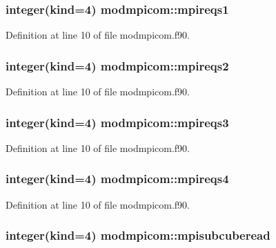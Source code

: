 \hypertarget{classmodmpicom_a34052e13410e6236c45dcfc1b5563200}{
\subsubsection[{mpireqs1}]{\setlength{\rightskip}{0pt plus 5cm}integer(kind=4) modmpicom\-::mpireqs1}}\label{classmodmpicom_a34052e13410e6236c45dcfc1b5563200}


Definition at line 10 of file modmpicom.\-f90.

\hypertarget{classmodmpicom_a24670bd8507b230a6be2c2f3afabf5c1}{
\subsubsection[{mpireqs2}]{\setlength{\rightskip}{0pt plus 5cm}integer(kind=4) modmpicom\-::mpireqs2}}\label{classmodmpicom_a24670bd8507b230a6be2c2f3afabf5c1}


Definition at line 10 of file modmpicom.\-f90.

\hypertarget{classmodmpicom_a7105e5547fa246381624c998c59249b9}{
\subsubsection[{mpireqs3}]{\setlength{\rightskip}{0pt plus 5cm}integer(kind=4) modmpicom\-::mpireqs3}}\label{classmodmpicom_a7105e5547fa246381624c998c59249b9}


Definition at line 10 of file modmpicom.\-f90.

\hypertarget{classmodmpicom_a848fe3dd718230ed7fb98e58796619ea}{
\subsubsection[{mpireqs4}]{\setlength{\rightskip}{0pt plus 5cm}integer(kind=4) modmpicom\-::mpireqs4}}\label{classmodmpicom_a848fe3dd718230ed7fb98e58796619ea}


Definition at line 10 of file modmpicom.\-f90.

\hypertarget{classmodmpicom_afee5305bd782226daffc69f8db2af8a7}{
\subsubsection[{mpisubcuberead}]{\setlength{\rightskip}{0pt plus 5cm}integer(kind=4) modmpicom\-::mpisubcuberead}}\label{classmodmpicom_afee5305bd782226daffc69f8db2af8a7}


